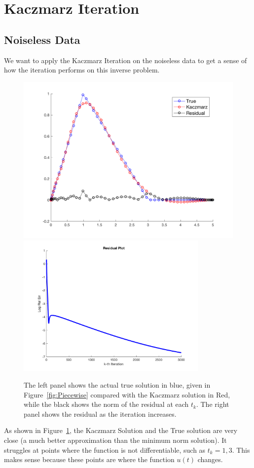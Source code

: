 \documentclass{article}
\begin{document}
\section{Kaczmarz Iteration}

\subsection{Noiseless Data}

We want to apply the Kaczmarz Iteration on the noiseless data to get a sense of how the iteration performs on this inverse problem.

\begin{figure}[H]
    \centerline{
    \includegraphics[height = 7 cm]{Noiseless.png}\includegraphics[height = 7cm]{Residuals-Noiseless.png}
    }
    \caption{\label{fig:Noiseless} The left panel shows the actual true solution in blue, given in Figure~\ref{fig:Piecewise} compared with the Kaczmarz solution in Red, while the black shows the norm of the residual at each $t_k$. The right panel shows the residual as the iteration increases.}
\end{figure}

As shown in Figure~\ref{fig:Noiseless}, the Kaczmarz Solution and the True solution are very close (a much better approximation than the minimum norm solution). It struggles at points where the function is not differentiable, such as $t_{k} = 1, 3$. This makes sense because these points are where the function $u(t)$ changes.
\end{document}
